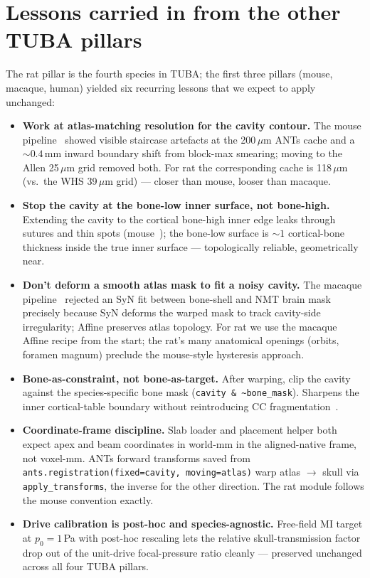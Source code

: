 \documentclass{compactarticle}
\begin{document}
\section{Lessons carried in from the other TUBA pillars}
\label{sec:lessons}

The rat pillar is the fourth species in TUBA; the first three pillars
(mouse, macaque, human) yielded six recurring lessons that we expect
to apply unchanged:

\begin{itemize}[leftmargin=*]
\item \textbf{Work at atlas-matching resolution for the cavity contour.}
      The mouse pipeline~\cite{tuba-mouse} showed visible staircase
      artefacts at the 200\,$\mu$m ANTs cache and a ${\sim}0.4$\,mm
      inward boundary shift from block-max smearing; moving to the
      Allen 25\,$\mu$m grid removed both. For rat the corresponding
      cache is 118\,$\mu$m (vs.\ the WHS 39\,$\mu$m grid) --- closer
      than mouse, looser than macaque.
\item \textbf{Stop the cavity at the bone-low inner surface, not
      bone-high.} Extending the cavity to the cortical bone-high
      inner edge leaks through sutures and thin spots
      (mouse~\cite{tuba-mouse}); the bone-low surface is ${\sim}1$
      cortical-bone thickness inside the true inner surface ---
      topologically reliable, geometrically near.
\item \textbf{Don't deform a smooth atlas mask to fit a noisy
      cavity.} The macaque pipeline~\cite{tuba-macaque} rejected an
      SyN fit between bone-shell and NMT brain mask precisely because
      SyN deforms the warped mask to track cavity-side irregularity;
      Affine preserves atlas topology. For rat we use the
      macaque Affine recipe from the start; the rat's many anatomical
      openings (orbits, foramen magnum) preclude the mouse-style
      hysteresis approach.
\item \textbf{Bone-as-constraint, not bone-as-target.} After warping,
      clip the cavity against the species-specific bone mask
      (\texttt{cavity \& \textasciitilde bone\_mask}). Sharpens the
      inner cortical-table boundary without reintroducing CC
      fragmentation~\cite{tuba-macaque}.
\item \textbf{Coordinate-frame discipline.} Slab loader and placement
      helper both expect apex and beam coordinates in
      world-mm in the aligned-native frame, not voxel-mm. ANTs forward
      transforms saved from
      \texttt{ants.registration(fixed=cavity, moving=atlas)} warp
      atlas $\to$ skull via \texttt{apply\_transforms}, the inverse
      for the other direction. The rat module follows the mouse
      convention exactly.
\item \textbf{Drive calibration is post-hoc and species-agnostic.}
      Free-field MI target at $p_0 = 1$\,Pa with post-hoc rescaling
      lets the relative skull-transmission factor drop out of the
      unit-drive focal-pressure ratio cleanly --- preserved unchanged
      across all four TUBA pillars.
\end{itemize}
\end{document}
